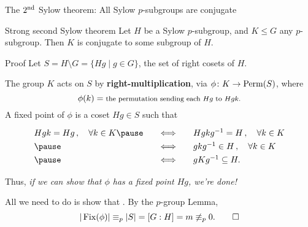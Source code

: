 \documentclass[8pt, handout]{beamer}
\newcommand{\Pause}{\pause}      %
\begin{document}

\begin{frame}{The $2^{\rm nd}$ Sylow theorem: All Sylow $p$-subgroups are 
    conjugate} 

  \begin{block}{Strong second Sylow theorem}
    Let $H$ be a Sylow $p$-subgroup, and $K\leq G$ any
    $p$-subgroup. Then $K$ is conjugate to some subgroup of $H$.
  \end{block}  
  
  \begin{exampleblock}{Proof} %
    Let $S=H\!\setminus\!G=\{Hg\mid g\in G\}$, the set of right cosets of $H$.
    
    \Pause\medskip
    
    The group $K$ acts on $S$ by \textbf{right-multiplication}, via $\phi\colon
    K\to\operatorname{Perm}(S)$, where \vspace{-1mm}
    \[
    \phi(k)=\mbox{\footnotesize the permutation sending each $Hg$ to
      $Hgk$.}
    \]   
    \pause A {\color{xGreen}fixed point} of $\phi$ is a coset $Hg\in S$ such
    that \vspace{-1mm}
    \[
    \renewcommand{\arraystretch}{1.3}
    \begin{array}{lll}
      Hgk=Hg\,,\quad\forall k\in K\Pause\quad & \Longleftrightarrow\quad &
      Hgkg^{-1}=H\,,\quad\forall k\in K
      \\ \Pause \quad &\Longleftrightarrow\quad &
      gkg^{-1}\in H\,,\quad\forall k\in K
      \\ \Pause \quad &\Longleftrightarrow\quad &
      gKg^{-1}\subseteq H.
    \end{array}
    \]

  \Pause

  Thus, \emph{if we can show that $\phi$ has a fixed point $Hg$, we're done!}

  \pause\medskip

  All we need to do is show that
  . \Pause By the $p$-group Lemma,
  \[
  |\operatorname{Fix}(\phi)|\equiv_p|S|=[G:H]=m\not\equiv_p 0. \tag*{$\hfill\Box$}
  \]
  \end{exampleblock}
  
\end{frame}

\end{document}

